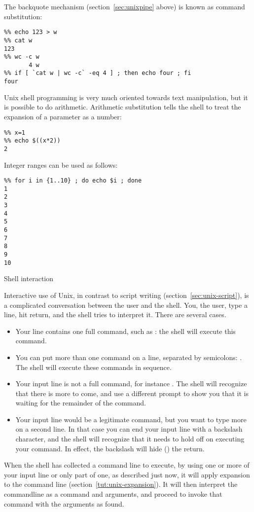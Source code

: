 The backquote mechanism (section~\ref{sec:unixpipe} above)
is known as command substitution:
\begin{verbatim}
%% echo 123 > w
%% cat w
123
%% wc -c w
       4 w
%% if [ `cat w | wc -c` -eq 4 ] ; then echo four ; fi
four
\end{verbatim}

Unix shell programming is very much oriented towards text manipulation, but it 
is possible to do arithmetic. 
Arithmetic substitution tells the shell to treat the expansion of a
parameter as a number:
\begin{verbatim}
%% x=1
%% echo $((x*2))
2
\end{verbatim}

Integer ranges can be used as follows:
\begin{verbatim}
%% for i in {1..10} ; do echo $i ; done
1
2
3
4
5
6
7
8
9
10
\end{verbatim}

 {Shell interaction}

Interactive use of Unix, in contrast to script writing
(section~\ref{sec:unix-script}), is a complicated conversation between
the user and the shell. You, the user, type a line, hit return, and
the shell tries to interpret it. There are several cases.
\begin{itemize}
\item Your line contains one full command, such as : the
  shell will execute this command.
\item You can put more than one command on a line, separated by
  semicolons: . The shell will execute these
  commands in sequence.
\item Your input line is not a full command, for instance . The shell will recognize that there is more to come, and use
  a different prompt to show you that it is waiting for the remainder
  of the command.
\item Your input line would be a legitimate command, but you want to
  type more on a second line. In that case you can end your input line
  with a backslash character, and the shell will recognize that it
  needs to hold off on executing your command. In effect, the
  backslash will hide () the return.
\end{itemize}

When the shell has collected a command line to execute, by using one or
more of your input line or only part of one, as described just now, it
will apply expansion to the command line
(section~\ref{tut:unix-expansion}). It will then interpret the
commandline as a command and arguments, and proceed to invoke that
command with the arguments as found.

